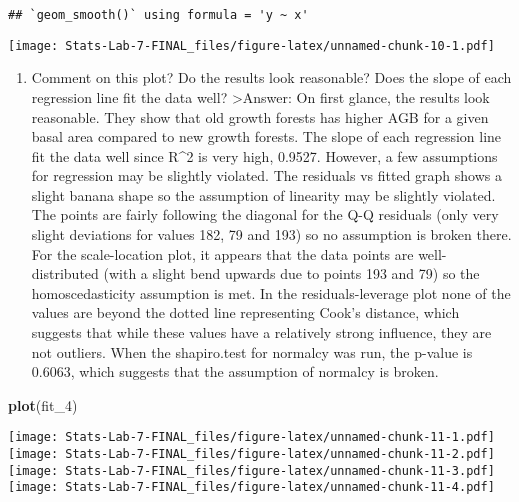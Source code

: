 \documentclass[
]{article}
\newenvironment{Shaded}{\begin{snugshade}}{\end{snugshade}}
\newcommand{\FunctionTok}[1]{\textcolor[rgb]{0.13,0.29,0.53}{\textbf{#1}}}
\newcommand{\NormalTok}[1]{#1}
\newcommand{\SpecialCharTok}[1]{\textcolor[rgb]{0.81,0.36,0.00}{\textbf{#1}}}
\providecommand{\tightlist}{%
  \setlength{\itemsep}{0pt}\setlength{\parskip}{0pt}}
\begin{document}
\begin{verbatim}
## `geom_smooth()` using formula = 'y ~ x'
\end{verbatim}

\texttt{[image: Stats-Lab-7-FINAL\_files/figure-latex/unnamed-chunk-10-1.pdf]}

\begin{enumerate}
\def\labelenumi{\alph{enumi}.}
\setcounter{enumi}{4}
\tightlist
\item
  Comment on this plot? Do the results look reasonable? Does the slope
  of each regression line fit the data well? \textgreater Answer: On
  first glance, the results look reasonable. They show that old growth
  forests has higher AGB for a given basal area compared to new growth
  forests. The slope of each regression line fit the data well since
  R\^{}2 is very high, 0.9527. However, a few assumptions for regression
  may be slightly violated. The residuals vs fitted graph shows a slight
  banana shape so the assumption of linearity may be slightly violated.
  The points are fairly following the diagonal for the Q-Q residuals
  (only very slight deviations for values 182, 79 and 193) so no
  assumption is broken there. For the scale-location plot, it appears
  that the data points are well-distributed (with a slight bend upwards
  due to points 193 and 79) so the homoscedasticity assumption is met.
  In the residuals-leverage plot none of the values are beyond the
  dotted line representing Cook's distance, which suggests that while
  these values have a relatively strong influence, they are not
  outliers. When the shapiro.test for normalcy was run, the p-value is
  0.6063, which suggests that the assumption of normalcy is broken.
\end{enumerate}

\begin{Shaded}
\begin{Highlighting}[]
\FunctionTok{plot}\NormalTok{(fit\_4)}
\end{Highlighting}
\end{Shaded}

\texttt{[image: Stats-Lab-7-FINAL\_files/figure-latex/unnamed-chunk-11-1.pdf]}
\texttt{[image: Stats-Lab-7-FINAL\_files/figure-latex/unnamed-chunk-11-2.pdf]}
\texttt{[image: Stats-Lab-7-FINAL\_files/figure-latex/unnamed-chunk-11-3.pdf]}
\texttt{[image: Stats-Lab-7-FINAL\_files/figure-latex/unnamed-chunk-11-4.pdf]}

\begin{Shaded}
\end{Shaded}
\end{document}
